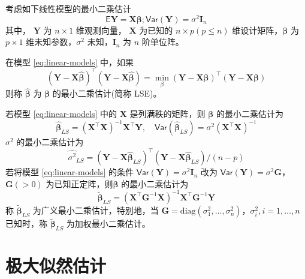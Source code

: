 \documentclass[12pt,a4paper,UTF8,twoside]{book}
\theoremstyle{definition}
\theoremstyle{definition}
\theoremstyle{definition}
\theoremstyle{remark}
\let\BeginKnitrBlock\begin \let\EndKnitrBlock\end
\begin{document}
考虑如下线性模型的最小二乘估计 \begin{equation}
\mathsf{E}\mathbf{Y} = \mathbf{X}\boldsymbol{\beta}; \mathsf{Var}(\mathbf{Y}) = \sigma^2 \mathbf{I}_{n} \label{eq:linear-models}
\end{equation} \noindent 其中， \(\mathbf{Y}\) 为 \(n \times 1\)
维观测向量， \(\mathbf{X}\) 为已知的 \(n \times p (p \leq n)\)
维设计矩阵，\(\boldsymbol{\beta}\) 为 \(p \times 1\)
维未知参数，\(\sigma^2\) 未知，\(\mathbf{I}_{n}\) 为 \(n\) 阶单位阵。
\BeginKnitrBlock{definition}[最小二乘估计]
\protect\hypertarget{def:least-squares-estimate}{}{\label{def:least-squares-estimate}
{} }在模型 \eqref{eq:linear-models} 中，如果
\begin{equation}
(\mathbf{Y} - \mathbf{X}\hat{\boldsymbol{\beta}})^{\top}(\mathbf{Y} - \mathbf{X}\hat{\boldsymbol{\beta}}) = \min_{\beta}(\mathbf{Y} - \mathbf{X}\boldsymbol{\beta})^{\top}(\mathbf{Y} - \mathbf{X}\boldsymbol{\beta}) \label{eq:least-squares}
\end{equation} \noindent 则称 \(\hat{\boldsymbol{\beta}}\) 为
\(\boldsymbol{\beta}\) 的最小二乘估计(简称 LSE)\citep{wang2004}。
\EndKnitrBlock{definition}

\BeginKnitrBlock{theorem}[最小二乘估计]
\protect\hypertarget{thm:unbiased}{}{\label{thm:unbiased}
{} }若模型 \eqref{eq:linear-models} 中的
\(\mathbf{X}\) 是列满秩的矩阵，则 \(\boldsymbol{\beta}\)
的最小二乘估计为 \[
\hat{\boldsymbol{\beta}}_{LS} = ( \mathbf{X}^{\top}\mathbf{X} )^{-1}\mathbf{X}^{\top} \mathbf{Y}, \quad  \mathsf{Var}(\hat{\boldsymbol{\beta}}_{LS}) = \sigma^2 (\mathbf{X}^{\top}\mathbf{X})^{-1}  
\] \noindent \(\sigma^2\) 的最小二乘估计为 \[
\hat{\sigma^2}_{LS} = (\mathbf{Y} - \mathbf{X}\hat{\boldsymbol{\beta}}_{LS})^{\top}(\mathbf{Y} - \mathbf{X}\hat{\boldsymbol{\beta}}_{LS})/(n - p)
\] 若将模型 \eqref{eq:linear-models} 的条件
\(\mathsf{Var}(\mathbf{Y}) = \sigma^2 \mathbf{I}_{n}\) 改为
\(\mathsf{Var}(\mathbf{Y}) = \sigma^2 \mathbf{G}\)， \(\mathbf{G}(>0)\)
为已知正定阵，则\(\boldsymbol{\beta}\) 的最小二乘估计为 \[
\tilde{\boldsymbol{\beta}}_{LS} = ( \mathbf{X}^{\top} \mathbf{G}^{-1} \mathbf{X})^{-1} \mathbf{X}^{\top} \mathbf{G}^{-1} \mathbf{Y} 
\] \noindent 称 \(\tilde{\boldsymbol{\beta}}_{LS}\)
为广义最小二乘估计，特别地，当
\(\mathbf{G} = \mathrm{diag}(\sigma^2_{1},\ldots,\sigma^2_{n})\)，\(\sigma^2_{i},i = 1,\ldots,n\)
已知时，称 \(\tilde{\boldsymbol{\beta}}_{LS}\) 为加权最小二乘估计。
\EndKnitrBlock{theorem}

\hypertarget{sec:def-mle}{%
\section{极大似然估计}\label{sec:def-mle}}
\end{document}
